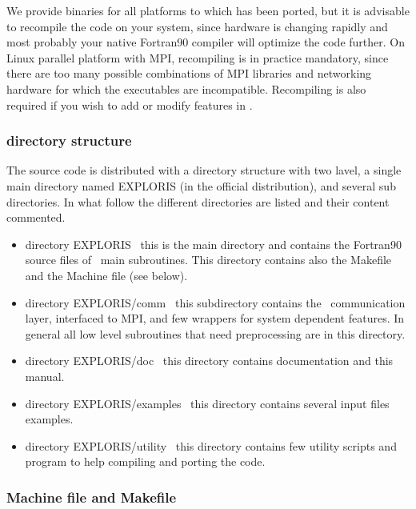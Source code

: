 We provide binaries for all
platforms to which \PDAC has been ported, but it is 
advisable to recompile the code on your system, 
since hardware is changing rapidly and most probably 
your native Fortran90 compiler will optimize
the code further. 
On Linux parallel platform with MPI, recompiling 
is in practice mandatory, since there are too
many possible combinations of MPI libraries and networking
hardware for which the executables are incompatible.
Recompiling is also required if you wish  
to add or modify features in \PDAC.

\subsubsection{ directory structure}

The \PDAC source code is distributed with a 
directory structure with two lavel, a single
main directory named EXPLORIS (in the official distribution), 
and several sub directories.
In what follow the different directories are listed
and their content commented.

\begin{itemize}

\item directory EXPLORIS \
      this is the main directory and contains the Fortran90 source files
      of \PDAC\ main subroutines. This directory contains also the 
      Makefile and the Machine file (see below).

\item directory EXPLORIS/comm \
      this subdirectory contains the \PDAC\ communication layer,
      interfaced to MPI, and few wrappers for system dependent
      features. In general all low level subroutines that 
      need preprocessing are in this directory.

\item directory EXPLORIS/doc \
      this directory contains \PDAC documentation and this manual.

\item directory EXPLORIS/examples \
      this directory contains several input files examples.
      
\item directory EXPLORIS/utility \
      this directory contains few utility scripts and program
      to help compiling and porting the code.

\end{itemize}

\subsubsection{ Machine file and Makefile}

